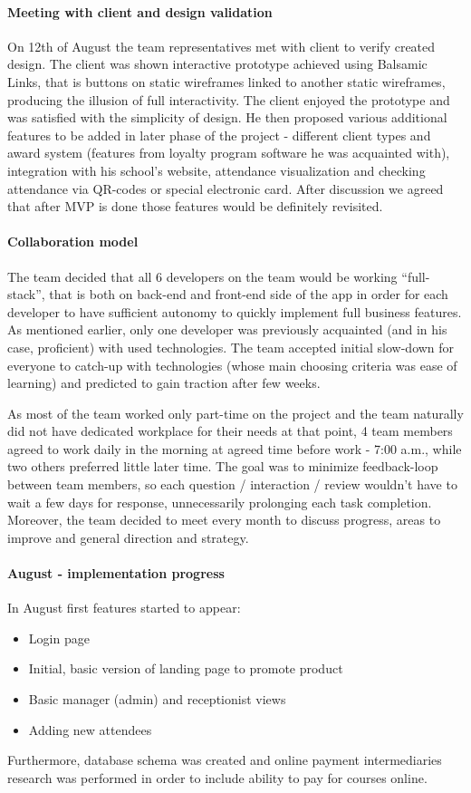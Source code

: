 \documentclass{article}
\begin{document}
\paragraph{Meeting with client and design validation}
On 12th of August the team representatives met with client to verify created design. The client was shown interactive prototype achieved using Balsamic Links, that is buttons on static wireframes linked to another static wireframes, producing the illusion of full interactivity. The client enjoyed the prototype and was satisfied with the simplicity of design. He then proposed various additional features to be added in later phase of the project - different client types and award system (features from loyalty program software he was acquainted with), integration with his school's website, attendance visualization and checking attendance via QR-codes or special electronic card. After discussion we agreed that after MVP is done those features would be definitely revisited.

\paragraph{Collaboration model}
The team decided that all 6 developers on the team would be working ``full-stack'', that is both on back-end and front-end side of the app in order for each developer to have sufficient autonomy to quickly implement full business features. As mentioned earlier, only one developer was previously acquainted (and in his case, proficient) with used technologies. The team accepted initial slow-down for everyone to catch-up with technologies (whose main choosing criteria was ease of learning) and predicted to gain traction after few weeks.

As most of the team worked only part-time on the project and the team naturally did not have dedicated workplace for their needs at that point, 4 team members agreed to work daily in the morning at agreed time before work - 7:00 a.m., while two others preferred little later time. The goal was to minimize feedback-loop between team members, so each question / interaction / review wouldn't have to wait a few days for response, unnecessarily prolonging each task completion. Moreover, the team decided to meet every month to discuss progress, areas to improve and general direction and strategy.

\paragraph{August - implementation progress}
In August first features started to appear:
\begin{itemize}
\item Login page
\item Initial, basic version of landing page to promote product
\item Basic manager (admin) and receptionist views
\item Adding new attendees
\end{itemize}
Furthermore, database schema was created and online payment intermediaries research was performed in order to include ability to pay for courses online.
\end{document}
